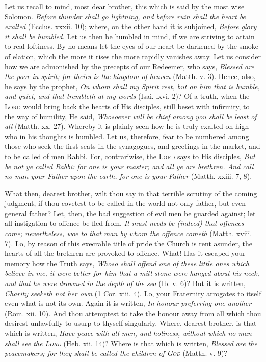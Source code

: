 Let us recall to mind, most dear brother, this which is said by the most wise Solomon. \emph{Before thunder shall go lightning, and before ruin shall the heart be exalted} (Ecclus. xxxii. 10); where, on the other hand it is subjoined, \emph{Before glory it shall be humbled.} Let us then be humbled in mind, if we are striving to attain to real loftiness. By no means let the eyes of our heart be darkened by the smoke of elation, which the more it rises the more rapidly vanishes away. Let us consider how we are admonished by the precepts of our Redeemer, who says, \emph{Blessed are the poor in spirit; for theirs is the kingdom of heaven} (Matth. v. 3). Hence, also, he says by the prophet, \emph{On whom shall my Spirit rest, but on him that is humble, and quiet, and that trembleth at my words} (Isai. lxvi. 2)? Of a truth, when the \textsc{Lord} would bring back the hearts of His disciples, still beset with infirmity, to the way of humility, He said, \emph{Whosoever will be chief among you shall be least of all} (Matth. xx. 27). Whereby it is plainly seen how he is truly exalted on high who in his thoughts is humbled. Let us, therefore, fear to be numbered among those who seek the first seats in the synagogues, and greetings in the market, and to be called of men Rabbi. For, contrariwise, the \textsc{Lord} says to His disciples, \emph{But be not ye called Rabbi: for one is your master; and all ye are brethren. And call no man your Father upon the earth, for one is your Father} (Matth. xxiii. 7, 8).

What then, dearest brother, wilt thou say in that terrible scrutiny of the coming judgment, if thou covetest to be called in the world not only father, but even general father? Let, then, the bad suggestion of evil men be guarded against; let all instigation to offence be fled from. \emph{It must needs be (indeed) that offences come; nevertheless, woe to that man by whom the offence cometh} (Matth. xviii. 7). Lo, by reason of this execrable title of pride the Church is rent asunder, the hearts of all the brethren are provoked to offence. What! Has it escaped your memory how the Truth says, \emph{Whoso shall offend one of these little ones which believe in me, it were better for him that a mill stone were hanged about his neck, and that he were drowned in the depth of the sea} (Ib. v. 6)? But it is written, \emph{Charity seeketh not her own} (1 Cor. xiii. 4). Lo, your Fraternity arrogates to itself even what is not its own. Again it is written, \emph{In honour preferring one another} (Rom. xii. 10). And thou attemptest to take the honour away from all which thou desirest unlawfully to usurp to thyself singularly. Where, dearest brother, is that which is written, \emph{Have peace with all men, and holiness, without which no man shall see the \textsc{Lord}} (Heb. xii. 14)? Where is that which is written, \emph{Blessed are the peacemakers; for they shall be called the children of \textsc{God}} (Matth. v. 9)?

